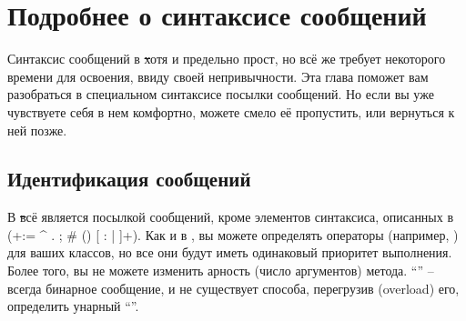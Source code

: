 \documentclass[a4paper,10pt,twoside]{book}
\begin{document}
	\renewcommand{\nnbb}[2]{} %
	\sloppy
\fi
\chapter{Подробнее о синтаксисе сообщений}

Синтаксис сообщений в \st хотя и предельно прост, но всё же требует некоторого времени для освоения, ввиду своей непривычности.
Эта глава поможет вам разобраться в специальном синтаксисе посылки сообщений.
Но если вы уже чувствуете себя в нем комфортно, можете смело её пропустить, или вернуться к ней позже.

\section{Идентификация сообщений}

В \st всё является посылкой сообщений, кроме элементов синтаксиса, описанных в  (\ct+:= ^ . ; # () {} [ : | ]+).
Как и в , вы можете определять операторы (например, \ct{+}) для ваших классов, но все они будут иметь одинаковый приоритет выполнения.
Более того, вы не можете изменить арность (число аргументов) метода. ``\ct{-}'' -- всегда бинарное сообщение, и не существует способа, перегрузив (overload) его, определить унарный ``\ct{-}''.
\end{document}
